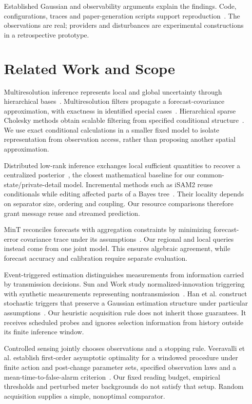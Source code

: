 \documentclass[conference]{IEEEtran}
\begin{document}
Established Gaussian and observability arguments explain the findings. Code, configurations, traces and paper-generation scripts support reproduction~\cite{artifact}. The observations are real; providers and disturbances are experimental constructions in a retrospective prototype.

\section{Related Work and Scope}
Multiresolution inference represents local and global uncertainty through hierarchical bases~\cite{katzfuss2017}. Multiresolution filters propagate a forecast-covariance approximation, with exactness in identified special cases~\cite{mrf}. Hierarchical sparse Cholesky methods obtain scalable filtering from specified conditional structure~\cite{vecchia}. We use exact conditional calculations in a smaller fixed model to isolate representation from observation access, rather than proposing another spatial approximation.

Distributed low-rank inference exchanges local sufficient quantities to recover a centralized posterior~\cite{distributed}, the closest mathematical baseline for our common-state/private-detail model. Incremental methods such as iSAM2 reuse conditionals while editing affected parts of a Bayes tree~\cite{isam}. Their locality depends on separator size, ordering and coupling. Our resource comparisons therefore grant message reuse and streamed prediction.

MinT reconciles forecasts with aggregation constraints by minimizing forecast-error covariance trace under its assumptions~\cite{mint}. Our regional and local queries instead come from one joint model. This ensures algebraic agreement, while forecast accuracy and calibration require separate evaluation.

Event-triggered estimation distinguishes measurements from information carried by transmission decisions. Sun and Work study normalized-innovation triggering with synthetic measurements representing nontransmission~\cite{sun}. Han et al. construct stochastic triggers that preserve a Gaussian estimation structure under particular assumptions~\cite{han}. Our heuristic acquisition rule does not inherit those guarantees. It receives scheduled probes and ignores selection information from history outside its finite inference window.

Controlled sensing jointly chooses observations and a stopping rule. Veeravalli et al. establish first-order asymptotic optimality for a windowed procedure under finite action and post-change parameter sets, specified observation laws and a mean-time-to-false-alarm criterion~\cite{controlled}. Our fixed reading budget, empirical thresholds and perturbed meter backgrounds do not satisfy that setup. Random acquisition supplies a simple, nonoptimal comparator.
\end{document}
